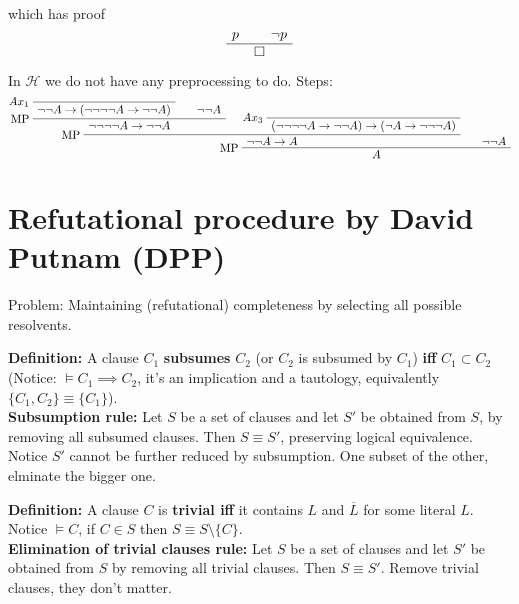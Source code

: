 which has proof
$$
\AxiomC{$p$}
\AxiomC{$\neg p$}
\BinaryInfC{$\square$}
\DisplayProof
$$

In $\mathcal{H}$ we do not have any preprocessing to do. Steps: 
$$
\AxiomC{}
\LeftLabel{$Ax_1$}
\UnaryInfC{$\neg \neg A \rightarrow (\neg \neg \neg \neg A \rightarrow \neg \neg A)$}
\AxiomC{$\neg \neg A$}
\LeftLabel{MP}
\BinaryInfC{$\neg \neg \neg \neg A \rightarrow \neg \neg A$}
\AxiomC{}
\LeftLabel{$Ax_3$}
\UnaryInfC{$(\neg \neg \neg \neg A \rightarrow \neg \neg A) \rightarrow (\neg A \rightarrow \neg \neg \neg A)$}
\LeftLabel{MP}
\BinaryInfC{$\neg \neg A \rightarrow A$}
\AxiomC{$\neg \neg A$}
\LeftLabel{MP}
\BinaryInfC{$A$}
\DisplayProof
$$

\newpage

\section{Refutational procedure by David Putnam (DPP)}

Problem: Maintaining (refutational) completeness by selecting all possible resolvents.\\

\begin{remark}
	\textbf{Definition:} A clause $C_1$ \textbf{subsumes} $C_2$ (or $C_2$ is subsumed by $C_1$) \textbf{iff} $C_1 \subset C_2$ (Notice: $\models C_1 \implies C_2$, it's an implication and a tautology, equivalently $\{C_1, C_2\} \equiv \{C_1\}$). \\
	
	\textbf{Subsumption rule:} Let $S$ be a set of clauses and let $S'$ be obtained from $S$, by removing all subsumed clauses. Then $S \equiv S'$, preserving logical equivalence. Notice $S'$ cannot be further reduced by subsumption. One subset of the other, elminate the bigger one.\\
\end{remark}

\begin{remark}
	\textbf{Definition:} A clause $C$ is \textbf{trivial iff} it contains $L$ and $\overline L$ for some literal $L$. Notice $\models C$, if $C \in S$ then $S \equiv S \setminus \{C\}$.\\
	
	\textbf{Elimination of trivial clauses rule:} Let $S$ be a set of clauses and let $S'$ be obtained from $S$ by removing all trivial clauses. Then $S \equiv S'$. Remove trivial clauses, they don't matter.\\
\end{remark}

